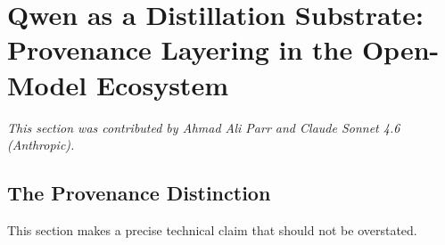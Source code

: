 






























\section{Qwen as a Distillation Substrate: Provenance Layering in the Open-Model Ecosystem}





\label{sec:qwen-substrate}





\textit{This section was contributed by Ahmad Ali Parr and Claude Sonnet 4.6 (Anthropic).}
















\subsection{The Provenance Distinction}











This section makes a precise technical claim that should not be overstated.





